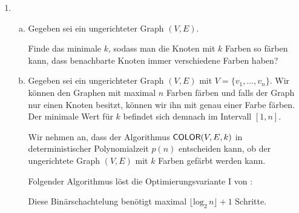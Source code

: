 \begin{enumerate}
  \item
    \begin{enumerate}[(a)]
    \item Gegeben sei ein ungerichteter Graph $(V,E)$.

      Finde das minimale $k$, sodass man die Knoten mit $k$ Farben so färben
        kann, dass benachbarte Knoten immer verschiedene Farben haben?

    \item Gegeben sei ein ungerichteter Graph $(V,E)$ mit $V = \{v_1, \ldots,
        v_n \}$. Wir können den Graphen mit maximal $n$ Farben färben und falls
        der Graph nur einen Knoten besitzt, können wir ihn mit genau einer Farbe
        färben. Der minimale Wert für $k$ befindet sich demnach im Intervall
        $[1, n]$.

        Wir nehmen an, dass der Algorithmus $\textsf{COLOR}(V, E, k)$ in
        deterministischer Polynomialzeit $p(n)$ entscheiden kann, ob der
        ungerichtete Graph $(V, E)$ mit $k$ Farben gefärbt werden kann.

        Folgender Algorithmus löst die Optimierungsvariante I von \COLOR{}:
        \begin{algorithmic}
            \ELSE{}
            \ENDIF{}
          \ENDWHILE{}
        \end{algorithmic}

        Diese Binärschachtelung benötigt maximal
        $\lfloor \text{log}_2 \, n \rfloor + 1$
        Schritte.


\end{enumerate}
\end{enumerate}
